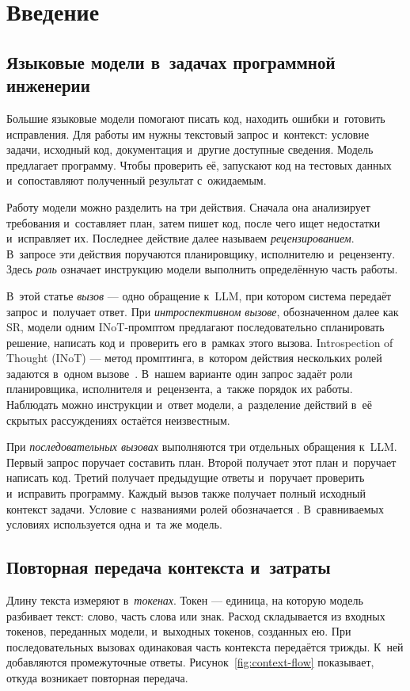 \section{Введение}\label{sec:intro}
\subsection{Языковые модели в~задачах программной инженерии}
Большие языковые модели помогают писать код, находить ошибки и~готовить исправления. Для работы им нужны текстовый запрос и~контекст: условие задачи, исходный код, документация и~другие доступные сведения. Модель предлагает программу. Чтобы проверить её, запускают код на тестовых данных и~сопоставляют полученный результат с~ожидаемым.

Работу модели можно разделить на три действия. Сначала она анализирует требования и~составляет план, затем пишет код, после чего ищет недостатки и~исправляет их. Последнее действие далее называем \emph{рецензированием}. В~запросе эти действия поручаются планировщику, исполнителю и~рецензенту. Здесь \emph{роль} означает инструкцию модели выполнить определённую часть работы.

В~этой статье \emph{вызов} --- одно обращение к~LLM, при котором система передаёт запрос и~получает ответ. При \emph{интроспективном вызове}, обозначенном далее как SR, модели одним INoT-промптом предлагают последовательно спланировать решение, написать код и~проверить его в~рамках этого вызова. Introspection of Thought (INoT) --- метод промптинга, в~котором действия нескольких ролей задаются в~одном вызове~\cite{sun2025inot}. В~нашем варианте один запрос задаёт роли планировщика, исполнителя и~рецензента, а~также порядок их работы. Наблюдать можно инструкции и~ответ модели, а~разделение действий в~её скрытых рассуждениях остаётся неизвестным.

При \emph{последовательных вызовах} выполняются три отдельных обращения к~LLM. Первый запрос поручает составить план. Второй получает этот план и~поручает написать код. Третий получает предыдущие ответы и~поручает проверить и~исправить программу. Каждый вызов также получает полный исходный контекст задачи. Условие с~названиями ролей обозначается \MultiCallRole{}. В~сравниваемых условиях используется одна и~та же модель.

\subsection{Повторная передача контекста и~затраты}
Длину текста измеряют в~\emph{токенах}. Токен --- единица, на которую модель разбивает текст: слово, часть слова или знак. Расход складывается из входных токенов, переданных модели, и~выходных токенов, созданных ею. При последовательных вызовах одинаковая часть контекста передаётся трижды. К~ней добавляются промежуточные ответы. Рисунок~\ref{fig:context-flow} показывает, откуда возникает повторная передача.

